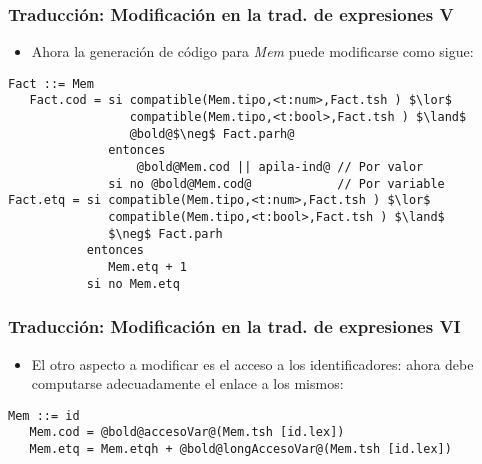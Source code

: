 \documentclass[hyperref={pdfpagelabels=false},tree-dvips,compress]{beamer}
\begin{document}
\begin{frame}[fragile]
\frametitle{Traducción: Modificación en la trad. de expresiones V}

\begin{itemize}
	\item Ahora la generación de código para \emph{Mem} puede modificarse como sigue:
\end{itemize}

\begin{lstlisting}[style=gramaticas,basicstyle=\footnotesize\ttfamily,mathescape]
Fact ::= Mem
   Fact.cod = si compatible(Mem.tipo,<t:num>,Fact.tsh ) $\lor$
                 compatible(Mem.tipo,<t:bool>,Fact.tsh ) $\land$
                 @bold@$\neg$ Fact.parh@
              entonces
                  @bold@Mem.cod || apila-ind@ // Por valor
              si no @bold@Mem.cod@            // Por variable
Fact.etq = si compatible(Mem.tipo,<t:num>,Fact.tsh ) $\lor$
              compatible(Mem.tipo,<t:bool>,Fact.tsh ) $\land$
              $\neg$ Fact.parh
           entonces
              Mem.etq + 1
           si no Mem.etq
\end{lstlisting}

\end{frame}
\begin{frame}[fragile]
\frametitle{Traducción: Modificación en la trad. de expresiones VI}

\begin{itemize}
	\item El otro aspecto a modificar es el acceso a los identificadores: ahora debe computarse adecuadamente el enlace a los mismos:
\end{itemize}

\begin{lstlisting}[style=gramaticas,basicstyle=\footnotesize\ttfamily,mathescape]
Mem ::= id
   Mem.cod = @bold@accesoVar@(Mem.tsh [id.lex])
   Mem.etq = Mem.etqh + @bold@longAccesoVar@(Mem.tsh [id.lex])
\end{lstlisting}

\end{frame}
\end{document}
